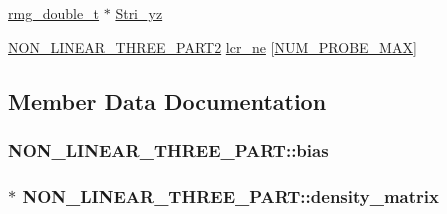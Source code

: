 \begin{DoxyCompactItemize}
\item 
\hyperlink{rmgtypes_8h_aaa16921c14f121c56eaa42390a340db8}{rmg\-\_\-double\-\_\-t} $\ast$ \hyperlink{struct_n_o_n___l_i_n_e_a_r___t_h_r_e_e___p_a_r_t_a111f195c2387db0a08ad0810ae7abec7}{Stri\-\_\-yz}
\item 
\hyperlink{struct_n_o_n___l_i_n_e_a_r___t_h_r_e_e___p_a_r_t2}{N\-O\-N\-\_\-\-L\-I\-N\-E\-A\-R\-\_\-\-T\-H\-R\-E\-E\-\_\-\-P\-A\-R\-T2} \hyperlink{struct_n_o_n___l_i_n_e_a_r___t_h_r_e_e___p_a_r_t_a4491a7647c0b3e75bdd5e797fc6316ca}{lcr\-\_\-ne} \mbox{[}\hyperlink{_l_c_r_8h_afcda4067eee22515cfb7bc59c61f6f33}{N\-U\-M\-\_\-\-P\-R\-O\-B\-E\-\_\-\-M\-A\-X}\mbox{]}
\end{DoxyCompactItemize}


\subsection{Member Data Documentation}
\hypertarget{struct_n_o_n___l_i_n_e_a_r___t_h_r_e_e___p_a_r_t_a3b3036d19384f42cfeff40dcc51cd23d}{
\subsubsection[{bias}]{ N\-O\-N\-\_\-\-L\-I\-N\-E\-A\-R\-\_\-\-T\-H\-R\-E\-E\-\_\-\-P\-A\-R\-T\-::bias}}\label{struct_n_o_n___l_i_n_e_a_r___t_h_r_e_e___p_a_r_t_a3b3036d19384f42cfeff40dcc51cd23d}
\hypertarget{struct_n_o_n___l_i_n_e_a_r___t_h_r_e_e___p_a_r_t_a48d1f3d405c0274049651991265fb3e0}{
\subsubsection[{density\-\_\-matrix}]{$\ast$ N\-O\-N\-\_\-\-L\-I\-N\-E\-A\-R\-\_\-\-T\-H\-R\-E\-E\-\_\-\-P\-A\-R\-T\-::density\-\_\-matrix}}\label{struct_n_o_n___l_i_n_e_a_r___t_h_r_e_e___p_a_r_t_a48d1f3d405c0274049651991265fb3e0}
